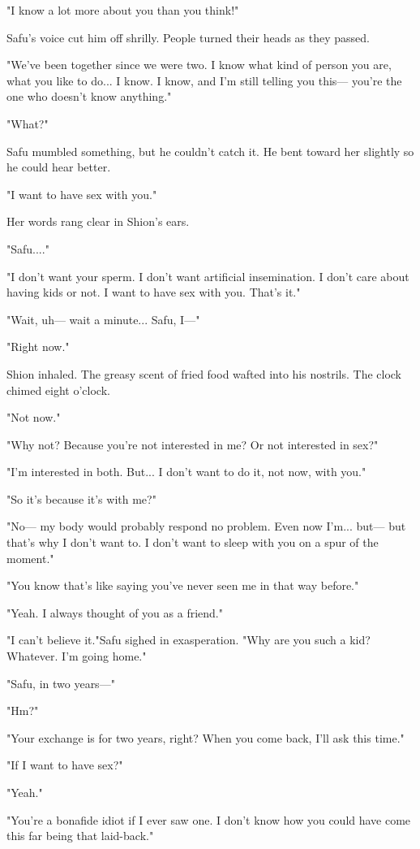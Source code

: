 "I know a lot more about you than you think!"

Safu's voice cut him off shrilly. People turned their heads as they
passed.

"We've been together since we were two. I know what kind of person you
are, what you like to do... I know. I know, and I'm still telling you
this--- you're the one who doesn't know anything."

"What?"

Safu mumbled something, but he couldn't catch it. He bent toward her
slightly so he could hear better.

"I want to have sex with you."

Her words rang clear in Shion's ears.~

"Safu...."

"I don't want your sperm. I don't want artificial insemination. I don't
care about having kids or not. I want to have sex with you. That's it."

"Wait, uh--- wait a minute... Safu, I---"

"Right now."

Shion inhaled. The greasy scent of fried food wafted into his nostrils.
The clock chimed eight o'clock.

"Not now."

"Why not? Because you're not interested in me? Or not interested in
sex?"

"I'm interested in both. But... I don't want to do it, not now, with
you."

"So it's because it's with me?"

"No--- my body would probably respond no problem. Even now I'm... but--- but
that's why I don't want to. I don't want to sleep with you on a spur of
the moment."

"You know that's like saying you've never seen me in that way before."

"Yeah. I always thought of you as a friend."

"I can't believe it."Safu sighed in exasperation. "Why are you such a
kid? Whatever. I'm going home."

"Safu, in two years---"

"Hm?"

"Your exchange is for two years, right? When you come back, I'll ask
this time."

"If I want to have sex?"

"Yeah."

"You're a bonafide idiot if I ever saw one. I don't know how you could
have come this far being that laid-back."

